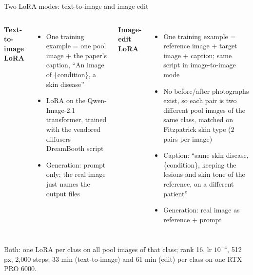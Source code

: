 \documentclass[aspectratio=169,11pt]{beamer}
\newcommand{\muted}[1]{{\color{gray}\footnotesize #1}}
\begin{document}
\begin{frame}{Two LoRA modes: text-to-image and image edit}
  \small
  \begin{columns}[T]
    \textbf{Text-to-image LoRA}
    \begin{itemize}
      \item One training example = one pool image + the paper's caption, ``An image of \{condition\}, a skin disease''
      \item LoRA on the Qwen-Image-2.1 transformer, trained with the vendored diffusers DreamBooth script
      \item Generation: prompt only; the real image just names the output files
    \end{itemize}
    \textbf{Image-edit LoRA}
    \begin{itemize}
      \item One training example = reference image + target image + caption; same script in image-to-image mode
      \item No before/after photographs exist, so each pair is two different pool images of the same class, matched on Fitzpatrick skin type (2 pairs per image)
      \item Caption: ``same skin disease, \{condition\}, keeping the lesions and skin tone of the reference, on a different patient''
      \item Generation: real image as reference + prompt
    \end{itemize}
  \end{columns}
  \vspace{0.4em}
  \muted{Both: one LoRA per class on all pool images of that class; rank 16, lr $10^{-4}$, 512 px, 2{,}000 steps; 33 min (text-to-image) and 61 min (edit) per class on one RTX PRO 6000.}
\end{frame}
\end{document}
